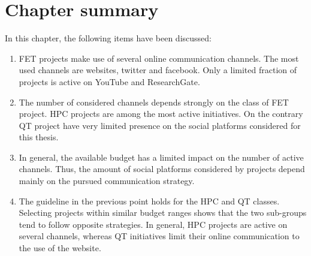 \section{Chapter summary} 
In this chapter, the following items have been discussed:

\begin{enumerate}
 \item FET projects make use of several online communication channels. The most used channels are websites, twitter and facebook. Only a limited fraction of projects is active on YouTube and ResearchGate.
 \item The number of considered channels depends strongly on the class of FET project. HPC projects are among the most active initiatives. On the contrary QT project have very limited presence on the social platforms considered for this thesis.
 \item In general, the available budget has a limited impact on the number of active channels. Thus, the amount of social platforms considered by projects depend mainly on the pursued communication strategy.
 \item The guideline in the previous point holds for the HPC and QT classes. Selecting projects within similar budget ranges shows that the two sub-groups tend to follow opposite strategies. In general, HPC projects are active on several channels, whereas QT initiatives limit their online communication to the use of the website.       
\end{enumerate}